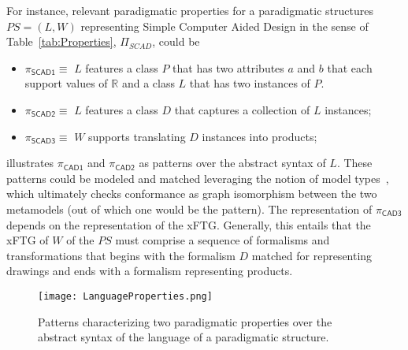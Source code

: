 For instance, relevant paradigmatic properties for a paradigmatic structures $PS
= \left(L,W\right)$ representing Simple Computer Aided Design in the sense of
Table~\ref{tab:Properties}, $\Pi_{SCAD}$, could be
\begin{itemize}
\item $\pi_{\mathsf{SCAD1}} \equiv$ $L$ features a class $P$ that has two 
attributes $a$ and $b$ that each support values of $\mathbb{R}$ and a class $L$ 
that has two instances of $P$. 
\item $\pi_{\mathsf{SCAD2}} \equiv$ $L$ features a class $D$ that captures a 
collection of $L$ instances; 
 
\item $\pi_{\mathsf{SCAD3}} \equiv$ $W$ supports translating $D$ instances into products;
\end{itemize}

\label{fig:LanguageProperties} illustrates $\pi_{\mathsf{CAD1}}$ and
$\pi_{\mathsf{CAD2}}$ as patterns over the abstract syntax of $L$. These
patterns could be modeled and matched leveraging the notion of model
types~\cite{steel2007model}, which ultimately checks conformance as graph
isomorphism between the two metamodels (out of which one would be the pattern).
The representation of $\pi_{\mathsf{CAD3}}$ depends on the representation of the
xFTG. Generally, this entails that the xFTG of $W$ of the $PS$ must comprise a
sequence of formalisms and transformations that begins with the formalism $D$
matched for representing drawings and ends with a formalism representing
products. 

\begin{figure}[t]
   \centering \texttt{[image: LanguageProperties.png]}
   \caption{Patterns characterizing two paradigmatic properties over the abstract 
   syntax of the language of a paradigmatic structure.}  
   \vspace{-1em}
   \label{fig:LanguageProperties}
\end{figure}



